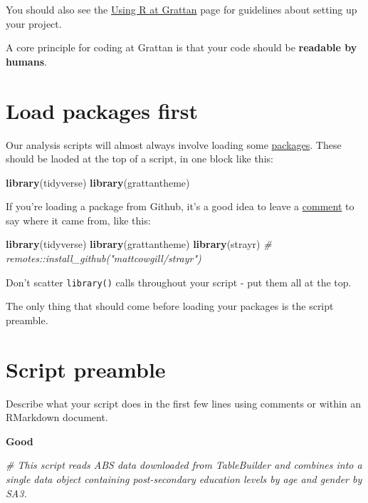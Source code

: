 \documentclass[]{book}
\newenvironment{Shaded}{\begin{snugshade}}{\end{snugshade}}
\newcommand{\CommentTok}[1]{\textcolor[rgb]{0.56,0.35,0.01}{\textit{#1}}}
\newcommand{\KeywordTok}[1]{\textcolor[rgb]{0.13,0.29,0.53}{\textbf{#1}}}
\newcommand{\NormalTok}[1]{#1}
\begin{document}
You should also see the \protect\hyperlink{organising-projects}{Using R at Grattan} page for guidelines about setting up your project.

A core principle for coding at Grattan is that your code should be \textbf{readable by humans}.

\hypertarget{load-packages-first}{%
\section{Load packages first}\label{load-packages-first}}

Our analysis scripts will almost always involve loading some \protect\hyperlink{packages}{packages}. These should be laoded at the top of a script, in one block like this:

\begin{Shaded}
\begin{Highlighting}[]
\KeywordTok{library}\NormalTok{(tidyverse)}
\KeywordTok{library}\NormalTok{(grattantheme)}
\end{Highlighting}
\end{Shaded}

If you're loading a package from Github, it's a good idea to leave a \protect\hyperlink{use-comments}{comment} to say where it came from, like this:

\begin{Shaded}
\begin{Highlighting}[]
\KeywordTok{library}\NormalTok{(tidyverse)}
\KeywordTok{library}\NormalTok{(grattantheme)}
\KeywordTok{library}\NormalTok{(strayr) }\CommentTok{# remotes::install_github("mattcowgill/strayr")}
\end{Highlighting}
\end{Shaded}

Don't scatter \texttt{library()} calls throughout your script - put them all at the top.

The only thing that should come before loading your packages is the script preamble.

\hypertarget{script-preamble}{%
\section{Script preamble}\label{script-preamble}}

Describe what your script does in the first few lines using comments or within an RMarkdown document.

\textbf{Good}

\begin{Shaded}
\begin{Highlighting}[]
\CommentTok{# This script reads ABS data downloaded from TableBuilder and combines into a single data object containing post-secondary education levels by age and gender by SA3. }
\end{Highlighting}
\end{Shaded}
\end{document}
